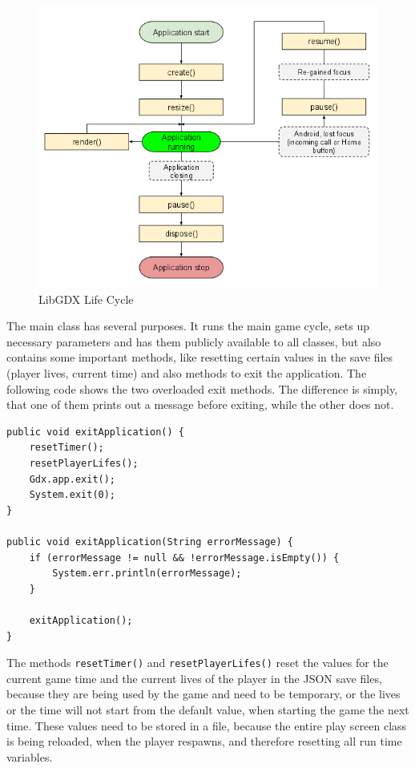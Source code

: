 \documentclass[12p]{article}
\begin{document}
\begin{figure}[ht]
  \center
  \includegraphics[width=1\textwidth]{Documentation/lifeCycle}
  \caption{LibGDX Life Cycle \cite{libGDXLifeCycle}}
  \label{fig:LibGDXLifeCycle}
\end{figure}

The main class has several purposes. It runs the main game cycle, sets up necessary parameters and has them publicly available to all classes, but also contains some important methods, like resetting certain values in the save files (player lives, current time) and also methods to exit the application. The following code shows the two overloaded exit methods. The difference is simply, that one of them prints out a message before exiting, while the other does not.

\begin{verbatim}
public void exitApplication() {
	resetTimer();
	resetPlayerLifes();
	Gdx.app.exit();
	System.exit(0);
}

public void exitApplication(String errorMessage) {
	if (errorMessage != null && !errorMessage.isEmpty()) {
		System.err.println(errorMessage);
	}

	exitApplication();
}
\end{verbatim}

The methods \texttt{resetTimer()} and \texttt{resetPlayerLifes()} reset the values for the current game time and the current lives of the player in the JSON save files, because they are being used by the game and need to be temporary, or the lives or the time will not start from the default value, when starting the game the next time. These values need to be stored in a file, because the entire play screen class is being reloaded, when the player respawns, and therefore resetting all run time variables.
\end{document}
